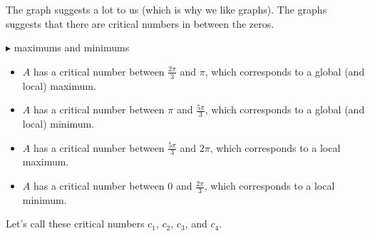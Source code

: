 \documentclass{ximera}
\begin{document}
The graph suggests a lot to us (which is why we like graphs).  The graphs suggests that there are critical numbers in between the zeros.  







$\blacktriangleright$ maximums and minimums

\begin{itemize}
\item $A$ has a critical number between $\frac{2\pi}{3}$ and $\pi$, which corresponds to a global (and local) maximum.
\item $A$ has a critical number between $\pi$ and $\frac{5\pi}{3}$, which corresponds to a global (and local) minimum.
\item $A$ has a critical number between $\frac{5\pi}{3}$ and $2\pi$, which corresponds to a local maximum.
\item $A$ has a critical number between $0$ and $\frac{2\pi}{3}$, which corresponds to a local minimum.
\end{itemize}


Let's call these critical numbers $c_1$, $c_2$, $c_3$, and $c_4$.
\end{document}
